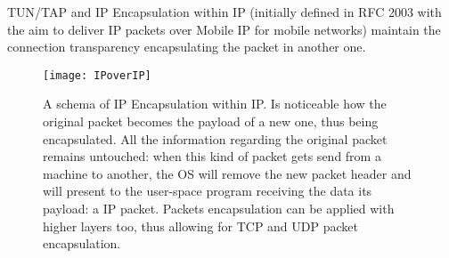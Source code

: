 TUN/TAP and IP Encapsulation within IP (initially defined in RFC 2003 with the
aim to deliver IP packets over Mobile IP for mobile networks) maintain the
connection transparency encapsulating the packet in another one.
\begin{figure}[t]
  \centering \texttt{[image: IPoverIP]}
  \caption[IP Encapsulation within IP packet schema]{A schema of IP
    Encapsulation within IP. Is noticeable how the original packet becomes the
    payload of a new one, thus being encapsulated. All the information
    regarding the original packet remains untouched: when this kind of packet
    gets send from a machine to another, the OS will remove the new packet
    header and will present to the user-space program receiving the data its
    payload: a IP packet. Packets encapsulation can be applied with higher
    layers too, thus allowing for TCP and UDP packet encapsulation.}
  \label{chap:prjan:img:ip_over_ip}
\end{figure}


